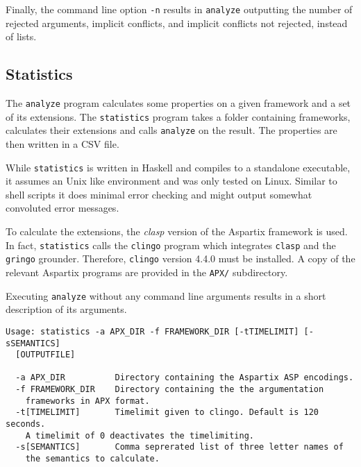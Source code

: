 \documentclass[parskip=half]{scrartcl}
\begin{document}
Finally, the command line option \texttt{-n} results in \texttt{analyze}
outputting the number of rejected arguments, implicit conflicts, and implicit
conflicts not rejected, instead of lists.

\subsection{Statistics}

The \texttt{analyze} program calculates some properties on a given framework and
a set of its extensions. The \texttt{statistics} program takes a folder
containing frameworks, calculates their extensions and calls \texttt{analyze} on
the result. The properties are then written in a CSV file.

While \texttt{statistics} is written in Haskell and compiles to a standalone
executable, it assumes an Unix like environment and was only tested on Linux.
Similar to shell scripts it does minimal error checking and might output
somewhat convoluted error messages.

To calculate the extensions, the \emph{clasp} version of the Aspartix framework
is used.  In fact, \texttt{statistics} calls the \texttt{clingo} program which
integrates \texttt{clasp} and the \texttt{gringo} grounder. Therefore,
\texttt{clingo} version 4.4.0 must be installed.  A copy of the relevant
Aspartix programs are provided in the \texttt{APX/} subdirectory.

Executing \texttt{analyze} without any command line arguments results in a short
description of its arguments.
\begin{verbatim}
Usage: statistics -a APX_DIR -f FRAMEWORK_DIR [-tTIMELIMIT] [-sSEMANTICS]
  [OUTPUTFILE]

  -a APX_DIR          Directory containing the Aspartix ASP encodings.
  -f FRAMEWORK_DIR    Directory containing the the argumentation
    frameworks in APX format.
  -t[TIMELIMIT]       Timelimit given to clingo. Default is 120 seconds.
    A timelimit of 0 deactivates the timelimiting.
  -s[SEMANTICS]       Comma seprerated list of three letter names of
    the semantics to calculate.
\end{verbatim}
\end{document}
